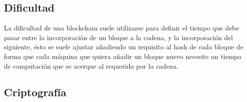 \documentclass[12pt]{report}
\begin{document}
\subsection{Dificultad}

	La dificultad de una blockchain suele utilizarse para definir el tiempo que debe pasar entre la incorporación de un bloque a la cadena, y la incorporación del siguiente, ésto se suele ajustar añadiendo un requisito al hash de cada bloque de forma que cada máquina que quiera añadir un bloque nuevo necesite un tiempo de computación que se acerque al requerido por la cadena.
	
\subsection{Criptografía}
\end{document}
